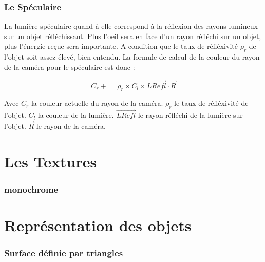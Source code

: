 \documentclass[fontsize=10pt, twoside=no]{scrartcl} %
\begin{document}
    \section{Le Spéculaire}

La lumière spéculaire quand à elle correspond à la réflexion des rayons lumineux sur un objet réfléchissant. Plus l'oeil
sera en face d'un rayon réfléchi sur un objet, plus l'énergie reçue sera importante. A condition que le taux de
réfléxivité $\rho_{r}$ de l'objet soit assez élevé, bien entendu. La formule de calcul de la couleur du rayon de la caméra
pour le spéculaire est donc :

$$C_{r} \mathrel{+}= \rho _{r} \times C_{l} \times \vec{LRefl} \cdot \vec{R}$$

Avec $C_{r}$ la couleur actuelle du rayon de la caméra. $\rho_{r}$ le taux de réfléxivité de l'objet. $C_{l}$ la couleur
de la lumière. $\vec{LRefl}$ le rayon réfléchi de la lumière sur l'objet. $\vec{R}$ le rayon de la caméra.

\part{Les Textures}

    \section{monochrome}

\part{Représentation des objets}

    \section{Surface définie par triangles}
    
\end{document}
